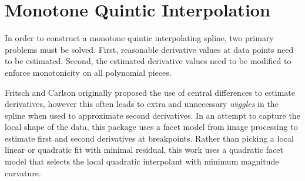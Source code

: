 \section{Monotone Quintic Interpolation}

In order to construct a monotone quintic interpolating spline, two
primary problems must be solved. First, reasonable derivative values
at data points need to be estimated. Second, the estimated derivative
values need to be modified to enforce monotonicity on all polynomial
pieces.

Fritsch and Carlson \cite{fritsch1980monotone} originally proposed the use of central differences
to estimate derivatives, however this often leads to extra and unnecessary
{\it wiggles} in the spline when used to approximate second derivatives.
In an attempt to capture the local shape of the data, this package uses a
facet model from image processing \cite{haralick1981facet} to estimate
first and second derivatives at breakpoints. Rather than picking a local
linear or quadratic fit with minimal residual, this work uses a quadratic
facet model that selects the local quadratic interpolant with minimum
magnitude curvature.

